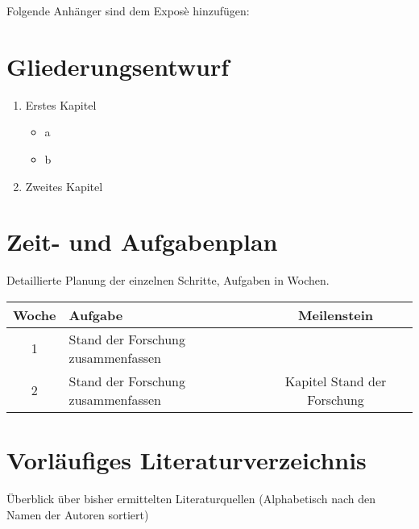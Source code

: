 Folgende Anhänger sind dem Exposè hinzufügen:
\section{Gliederungsentwurf}
\begin{enumerate}[topsep=0pt,itemsep=-1ex,partopsep=1ex,parsep=1ex]
\item Erstes Kapitel
\begin{itemize}[topsep=0pt,itemsep=-1ex,partopsep=1ex,parsep=1ex]
\item a
\item b
\end{itemize}
\item Zweites Kapitel
\end{enumerate}
\section{Zeit- und Aufgabenplan}
Detaillierte Planung der einzelnen Schritte, Aufgaben in Wochen.
\begin{table}[!h]
\begin{tabularx}{\textwidth}{ |c|X|c| }
  \hline
  Woche & Aufgabe & Meilenstein  \\
  \hline 
  1  & Stand der Forschung zusammenfassen&  \\ \hline
  2  & Stand der Forschung zusammenfassen & Kapitel Stand der Forschung   \\
  \hline
\end{tabularx}
\end{table}
\section{Vorläufiges Literaturverzeichnis}
Überblick über bisher ermittelten Literaturquellen (Alphabetisch nach den Namen der Autoren sortiert)
\nocite{*}
\singlespacing %


